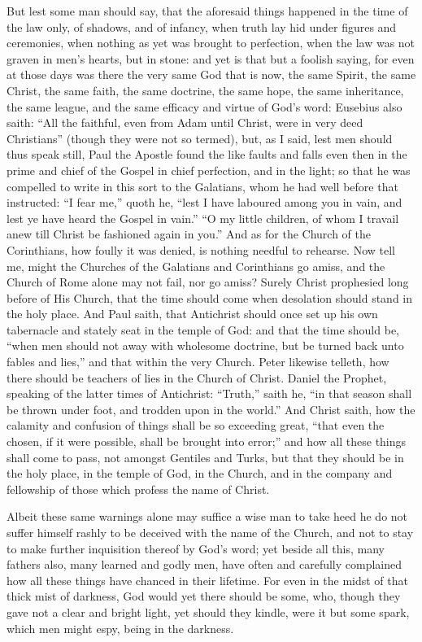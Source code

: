 But lest some man should say, that the aforesaid things happened
in the time of the law only, of shadows, and of infancy, when truth
lay hid under figures and ceremonies, when nothing as yet was brought
to perfection, when the law was not graven in men’s hearts, but
in stone: and yet is that but a foolish saying, for even at those days
was there the very same God that is now, the same Spirit, the same Christ,
the same faith, the same doctrine, the same hope, the same inheritance,
the same league, and the same efficacy and virtue of God’s word:
Eusebius also saith: “All the faithful, even from Adam until Christ,
were in very deed Christians” (though they were not so termed),
but, as I said, lest men should thus speak still, Paul the Apostle found
the like faults and falls even then in the prime and chief of the Gospel
in chief perfection, and in the light; so that he was compelled to write
in this sort to the Galatians, whom he had well before that instructed:
“I fear me,” quoth he, “lest I have laboured among
you in vain, and lest ye have heard the Gospel in vain.”
“O my little children, of whom I travail anew till Christ be fashioned
again in you.” And as for the Church of
the Corinthians, how foully it was denied, is nothing needful to rehearse.
Now tell me, might the Churches of the Galatians and Corinthians go
amiss, and the Church of Rome alone may not fail, nor go amiss?
Surely Christ prophesied long before of His Church, that the time should
come when desolation should stand in the holy place. And Paul
saith, that Antichrist should once set up his own tabernacle and stately
seat in the temple of God: and that the time should be, “when
men should not away with wholesome doctrine, but be turned back unto
fables and lies,” and that within the very Church. Peter
likewise telleth, how there should be teachers of lies in the Church
of Christ. Daniel the Prophet, speaking of the latter times of
Antichrist: “Truth,” saith he, “in that season shall
be thrown under foot, and trodden upon in the world.” And
Christ saith, how the calamity and confusion of things shall be so exceeding
great, “that even the chosen, if it were possible, shall be brought
into error;” and how all these things shall come to pass, not
amongst Gentiles and Turks, but that they should be in the holy place,
in the temple of God, in the Church, and in the company and fellowship
of those which profess the name of Christ.

Albeit these same warnings alone may suffice a wise
man to take heed he do not suffer himself rashly to be deceived with
the name of the Church, and not to stay to make further inquisition
thereof by God’s word; yet beside all this, many fathers also,
many learned and godly men, have often and carefully complained how
all these things have chanced in their lifetime. For even in the
midst of that thick mist of darkness, God would yet there should be
some, who, though they gave not a clear and bright light, yet should
they kindle, were it but some spark, which men might espy, being in
the darkness.

